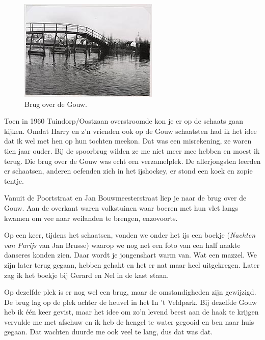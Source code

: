 \documentclass[12pt,twoside, openright]{memoir}
\begin{document}
\begin{figure}
\includegraphics[width=\textwidth]{img/ch13/Gouwbrug}
\caption*{\footnotesize Brug over de Gouw.}
\end{figure}

Toen in 1960 Tuindorp/Oostzaan overstroomde kon je er op de schaats gaan kijken. Omdat Harry en z’n vrienden ook op de Gouw schaatsten had ik het idee dat ik wel met hen op hun tochten meekon. Dat was een misrekening, ze waren tien jaar ouder. Bij de spoorbrug wilden ze me niet meer mee hebben en moest ik terug. Die brug over de Gouw was echt een verzamelplek. De allerjongsten leerden er schaatsen, anderen oefenden zich in het ijshockey, er stond een koek en zopie tentje.

Vanuit de Poortstraat en Jan Bouwmeesterstraat liep je naar de brug over de Gouw. Aan de overkant waren volkstuinen waar boeren met hun vlet langs kwamen om vee naar weilanden te brengen, enzovoorts. 

Op een keer, tijdens het schaatsen, vonden we onder het ijs een boekje (\emph{Nachten van Parijs} van Jan Brusse) waarop we nog net een foto van een half naakte danseres konden zien. Daar wordt je jongenshart warm van. Wat een mazzel. We zijn later terug gegaan, hebben gehakt en het er nat maar heel uitgekregen. Later zag ik het boekje bij Gerard en Nel in de kast staan. 

Op dezelfde plek is er nog wel een brug, maar de omstandigheden zijn gewijzigd. De brug lag op de plek achter de heuvel in het In ’t Veldpark. Bij dezelfde Gouw heb ik één keer gevist, maar het idee om zo’n levend beest aan de haak te krijgen vervulde me met afschuw en ik heb de hengel te water gegooid en ben naar huis gegaan. Dat wachten duurde me ook veel te lang, dus dat was dat. 
\end{document}
